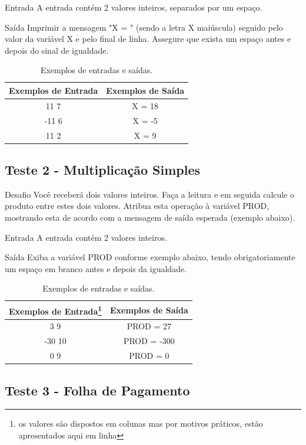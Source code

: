\documentclass[12pt,a4paper]{article}
\begin{document}
	Entrada
	A entrada contém 2 valores inteiros, separados por um espaço.
	
	Saída
	Imprimir a mensagem "X = " (sendo a letra X maiúscula) seguido pelo valor da variável X e pelo final de linha. Assegure que exista um espaço antes e depois do sinal de igualdade.
	
	\begin{table}[!htpb]
		\centering
		\begin{tabular}{|c|c|}
			\hline
			Exemplos de Entrada & Exemplos de Saída \\
			\hline
			11 7 & X = 18\\
			\hline
			-11 6 & X = -5\\
			\hline
			11 2 & X = 9\\
			\hline
		\end{tabular}
		\caption{Exemplos de entradas e saídas.}
		\label{tab:valEntradasSaidasTeste1}
	\end{table}
	
	\subsection{Teste 2 - Multiplicação Simples}
	Desafio
	Você receberá dois valores inteiros. Faça a leitura e em seguida calcule o produto entre estes dois valores. Atribua esta operação à variável PROD, mostrando esta de acordo com a mensagem de saída esperada (exemplo abaixo).   
	
	Entrada
	A entrada contém 2 valores inteiros.
	
	Saída
	Exiba a variável PROD conforme exemplo abaixo, tendo obrigatoriamente um espaço em branco antes e depois da igualdade.
	
	\begin{table}[!htpb]
		\centering
		\begin{tabular}{|c|c|}
			\hline
			Exemplos de Entrada\footnote{os valores são dispostos em colunas mas por motivos práticos, estão apresentados aqui em linha} & Exemplos de Saída \\
			\hline
			3 9 & PROD = 27\\
			\hline
			-30 10 & PROD = -300\\
			\hline
			0 9 & PROD = 0\\
			\hline
		\end{tabular}
		\caption{Exemplos de entradas e saídas.}
		\label{tab:valEntradasSaidasTeste2}
	\end{table}

	\subsection{Teste 3 - Folha de Pagamento}
	
\end{document}
